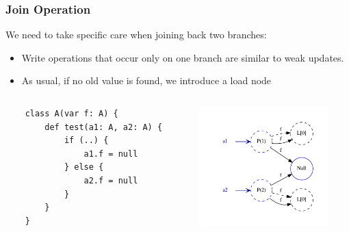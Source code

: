 \documentclass[hyperref={pdfpagelabels=false}]{beamer}
\begin{document}
\begin{frame}[fragile]
    \frametitle{Join Operation}

    We need to take specific care when joining back two branches:
    \begin{itemize}
        \item Write operations that occur only on one branch are similar to
        weak updates.
        \item As usual, if no old value is found, we introduce a load node
    \end{itemize}

    \begin{columns}
      \begin{column}{0.4\textwidth}
\begin{lstlisting}
    class A(var f: A) {
        def test(a1: A, a2: A) {
            if (..) {
                a1.f = null
            } else {
                a2.f = null
            }
        }
    }
\end{lstlisting}
      \end{column}
      \begin{column}{0.6\textwidth}
        \includegraphics[width=50mm]{images/join.pdf}
      \end{column}
    \end{columns}
\end{frame}
\end{document}
